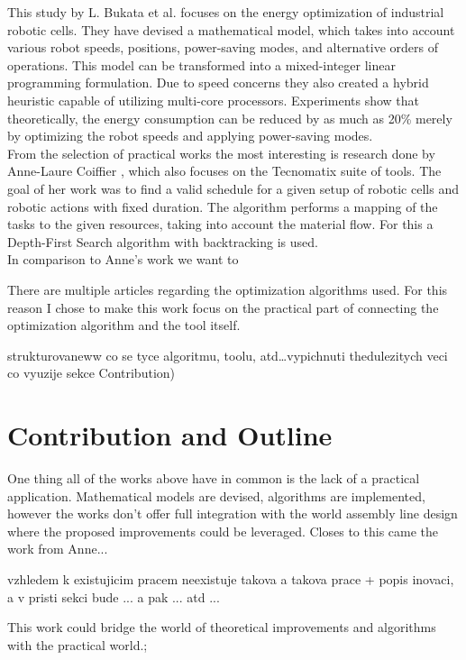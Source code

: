 This study by L. Bukata et al. \cite{EnergyOptimisationBukata} focuses on the energy optimization of industrial robotic cells. They have devised a mathematical model, which takes into account various robot speeds, positions, power-saving modes, and alternative orders of operations. This model can be transformed into a mixed-integer linear programming formulation. Due to speed concerns they also created a hybrid heuristic capable of utilizing multi-core processors. Experiments show that theoretically, the energy consumption can be reduced by as much as 20\% merely by optimizing the robot speeds and applying power-saving modes. \\

From the selection of practical works the most interesting is research done by Anne-Laure Coiffier \cite{AnneBacktracking}, which also focuses on the Tecnomatix suite of tools. The goal of her work was to find a valid schedule for a given setup of robotic cells and robotic actions with fixed duration. The algorithm performs a mapping of the tasks to the given resources, taking into account the material flow. For this a Depth-First Search algorithm with backtracking is used. \\

In comparison to Anne's work we want to 

There are multiple articles regarding the optimization algorithms used. For this reason I chose to make this work focus on the practical part of connecting the optimization algorithm and the tool itself.


strukturovaneww co se tyce algoritmu, toolu, atd\ldots vypichnuti thedulezitych veci co vyuzije sekce Contribution)

\section{Contribution and Outline}

One thing all of the works above have in common is the lack of a practical application. Mathematical models are devised, algorithms are implemented, however the works don't offer full integration with the world assembly line design where the proposed improvements could be leveraged. Closes to this came the work from Anne... 

vzhledem k existujicim pracem neexistuje takova a takova prace + popis inovaci, a v pristi sekci bude ... a pak ... atd ...

This work could bridge the world of theoretical improvements and algorithms with the practical world.; 

